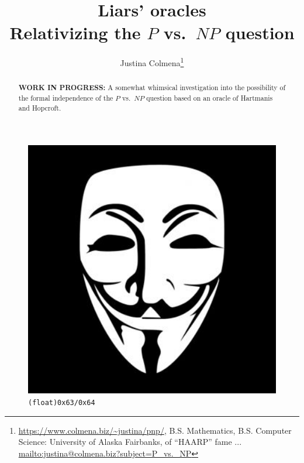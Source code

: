 \documentclass[letterpaper]{article}
\title{\textbf{Liars' oracles}\\ Relativizing the $P$ vs.\ $NP$ question}
\author{Justina Colmena\footnote{\url{https://www.colmena.biz/~justina/pnp/}, B.S. Mathematics, B.S. Computer Science: University of Alaska Fairbanks, of ``HAARP'' fame \cite[etc.]{haarp,haarp.net,begich2002angels,burks2010haarp,want2016haarp,smith1998haarp,freeland2014chemtrails} ... \url{mailto:justina@colmena.biz?subject=P_vs._NP}}}
\begin{document}
\sloppy
{}\maketitle
{}
\begin{abstract} {\color{red}\textbf{WORK IN PROGRESS:}}
A somewhat whimsical investigation into the possibility of the formal independence of the $P$ vs.\ $NP$ question based on an oracle of Hartmanis and Hopcroft.
\end{abstract}
\begin{figure}
	\includegraphics[width=1.0\textwidth]{images/guy_fawkes_mask.jpg}
	\caption[\texttt{(float)0x63/0x64}]{\texttt{(float)0x63/0x64} \cite{anon2012}}
\end{figure}

\tableofcontents

\listoffigures

\listofalgorithms

\listoftables
\end{document}
